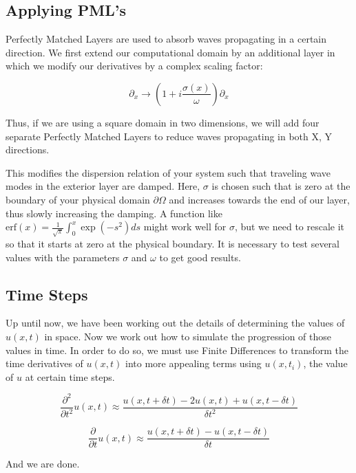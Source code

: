 \subsection{Applying PML's}

Perfectly Matched Layers are used to absorb waves propagating in a certain direction. We first extend our computational domain by an additional layer in which we modify our derivatives by a complex scaling factor:

\begin{equation}
\partial_x \rightarrow \left( 1 + i \frac{\sigma(x)}{\omega} \right) \partial_x
\end{equation}

Thus, if we are using a square domain in two dimensions, we will add four separate Perfectly Matched Layers to reduce waves propagating in both X, Y directions.

This modifies the dispersion relation of your system such that traveling wave modes in the exterior layer are damped. Here, $\sigma$ is chosen such that is zero at the boundary of your physical domain $\partial \Omega$ and increases towards the end of our layer, thus slowly increasing the damping. A function like $\text{erf}(x)=\frac{1}{\sqrt{\pi}}\int_0^x \exp(-s^2) ds$ might work well for $\sigma$, but we need to rescale it so that it starts at zero at the physical boundary. It is necessary to test several values with the parameters $\sigma$ and $\omega$ to get good results.

\subsection{Time Steps}

Up until now, we have been working out the details of determining the values of $u(x,t)$ in space. Now we work out how to simulate the progression of those values in time. In order to do so, we must use Finite Differences to transform the time derivatives of $u(x,t)$ into more appealing terms using $u(x,t_i)$, the value of $u$ at certain time steps. 

\begin{equation}
\frac{\partial^2}{\partial t^2} u(x,t) \approx \frac{u(x,t+\delta t) - 2 u(x,t) + u(x,t-\delta t)}{\delta t^2}
\end{equation}

\begin{equation}
\frac{\partial}{\partial t} u(x,t) \approx \frac{u(x,t+\delta t) - u(x,t-\delta t)}{\delta t}
\end{equation}




And we are done.














